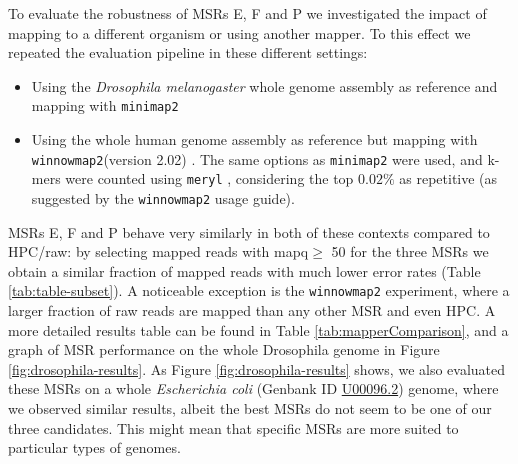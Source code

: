 \documentclass[
  11pt,
  twoside]{scrbook}
\begin{document}
To evaluate the robustness of MSRs E, F and P we investigated the impact of
mapping to a different organism or using another mapper. To this effect we
repeated the evaluation pipeline in these different settings:

\begin{itemize}
\item
  Using the \emph{Drosophila melanogaster} whole genome assembly as reference and
  mapping with \texttt{minimap2}
\item
  Using the whole human genome assembly as reference but mapping with
  \texttt{winnowmap2}(version 2.02) \autocite{jainWeightedMinimizerSampling2020}. The same
  options as \texttt{minimap2} were used, and k-mers were counted using \texttt{meryl}
  \autocite{rhieMerquryReferencefreeQuality2020}, considering the top \(0.02\%\) as
  repetitive (as suggested by the \texttt{winnowmap2} usage guide).
\end{itemize}

MSRs E, F and P behave very similarly in both of these contexts compared to
HPC/raw: by selecting mapped reads with mapq\(\geq\) 50 for the three MSRs we
obtain a similar fraction of mapped reads with much lower error rates (Table
\ref{tab:table-subset}). A noticeable exception is the \texttt{winnowmap2} experiment,
where a larger fraction of raw reads are mapped than any other MSR and even HPC.
A more detailed results table can be found in Table \ref{tab:mapperComparison},
and a graph of MSR performance on the whole Drosophila genome in Figure
\ref{fig:drosophila-results}. As Figure \ref{fig:drosophila-results} shows, we
also evaluated these MSRs on a whole \emph{Escherichia coli} (Genbank ID
\href{https://www.ncbi.nlm.nih.gov/nuccore/U00096.2}{U00096.2}) genome, where we
observed similar results, albeit the best MSRs do not seem to be one of our
three candidates. This might mean that specific MSRs are more suited to
particular types of genomes.
\end{document}
